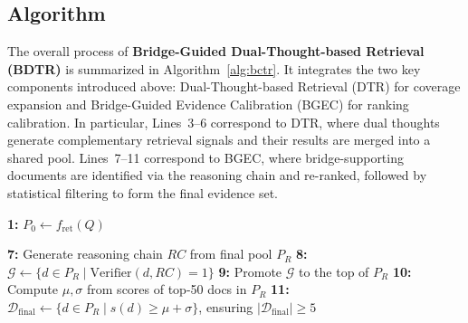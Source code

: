 \documentclass{article} %
\begin{document}
\subsection{Algorithm}
\label{sec:alg}
The overall process of {\bf Bridge-Guided Dual-Thought-based Retrieval (BDTR)} is summarized in Algorithm~\ref{alg:bctr}.  
It integrates the two key components introduced above: Dual-Thought-based Retrieval (DTR) for coverage expansion and Bridge-Guided Evidence Calibration (BGEC) for ranking calibration.  
In particular, Lines~3--6 correspond to DTR, where dual thoughts generate complementary retrieval signals and their results are merged into a shared pool.  
Lines~7--11 correspond to BGEC, where bridge-supporting documents are identified via the reasoning chain and re-ranked, followed by statistical filtering to form the final evidence set.  

\vspace{-3pt}
\begin{algorithm}[H]
\caption{BDTR: Bridge-Guided Dual-Thought-based Retrieval}
\label{alg:bctr}

\BlankLine
\textbf{1:} $P_0 \leftarrow \!f_{\text{ret}}(Q)$   


\BlankLine
\textbf{7:} Generate reasoning chain $RC$ from final pool $P_R$\;
\textbf{8:} $\mathcal{G} \leftarrow \{ d \in P_R \mid \text{Verifier}(d, RC) = 1 \}$   
\textbf{9:} Promote $\mathcal{G}$ to the top of $P_R$\;
\textbf{10:} Compute $\mu, \sigma$ from scores of top-50 docs in $P_R$\;
\textbf{11:} $\mathcal{D}_{\text{final}} \leftarrow \{ d \in P_R \mid s(d) \geq \mu + \sigma \}$, ensuring $|\mathcal{D}_{\text{final}}| \geq 5$\;

\;

\end{algorithm}
\end{document}
